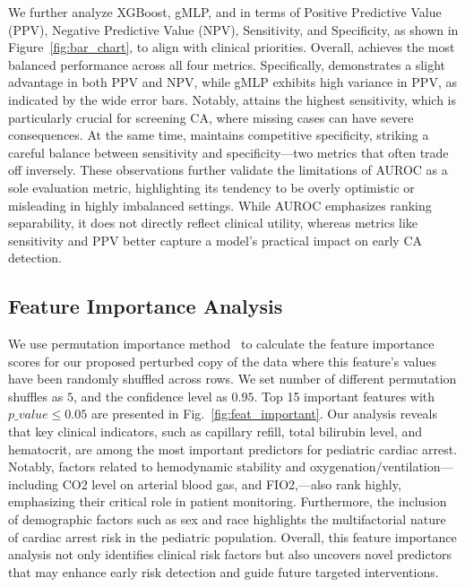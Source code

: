 We further analyze XGBoost, gMLP, and \modelname in terms of Positive Predictive Value (PPV), Negative Predictive Value (NPV), Sensitivity, and Specificity, as shown in Figure~\ref{fig:bar_chart}, to align with clinical priorities. Overall, \modelname achieves the most balanced performance across all four metrics.
Specifically, \modelname demonstrates a slight advantage in both PPV and NPV, while gMLP exhibits high variance in PPV, as indicated by the wide error bars. Notably, \modelname attains the highest sensitivity, which is particularly crucial for screening CA, where missing cases can have severe consequences. At the same time, \modelname maintains competitive specificity, striking a careful balance between sensitivity and specificity—two metrics that often trade off inversely.
These observations further validate the limitations of AUROC as a sole evaluation metric, highlighting its tendency to be overly optimistic or misleading in highly imbalanced settings. While AUROC emphasizes ranking separability, it does not directly reflect clinical utility, whereas metrics like sensitivity and PPV better capture a model’s practical impact on early CA detection.


\subsection{Feature Importance Analysis}
We use permutation importance method~\cite{altmann2010permutation} to calculate the feature importance scores for our proposed perturbed copy of the data where this feature's values have been randomly shuffled across rows. We set number of different permutation shuffles as $5$, and the confidence level as $0.95$. Top 15 important features with $p\_value \leq 0.05$ are presented in Fig.~\ref{fig:feat_important}.
Our analysis reveals that key clinical indicators, such as capillary refill, total bilirubin level, and hematocrit, are among the most important predictors for pediatric cardiac arrest. 
Notably, factors related to hemodynamic stability and oxygenation/ventilation—including CO2 level on arterial blood gas, and FIO2,—also rank highly, emphasizing their critical role in patient monitoring. Furthermore, the inclusion of demographic factors such as sex and race highlights the multifactorial nature of cardiac arrest risk in the pediatric population.
Overall, this feature importance analysis not only identifies clinical risk factors but also uncovers novel predictors that may enhance early risk detection and guide future targeted interventions.

